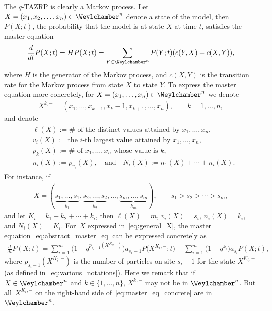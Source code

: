 The $q$-TAZRP is clearly a Markov process. Let $X = (x_1, x_2, \dotsc, x_n) \in \Weylchamber^n$ denote a state of the model, then $P(X; t)$, the probability that the model is at state $X$ at time $t$, satisf\/ies the master equation
\begin{gather} \label{eq:abstract_master_eq}
 \frac{d}{dt} P(X; t) = H P(X; t) = \sum_{Y \in \Weylchamber^n} P(Y; t) (c(Y, X) - c(X, Y)),
\end{gather}
where $H$ is the generator of the Markov process, and $c(X, Y)$ is the transition rate for the Markov process from state $X$ to state $Y$. To express the master equation more concretely, for $X = (x_1, \dotsc, x_n) \in \Weylchamber^n$ we denote
\begin{gather*}
 X^{k, -} = (x_1, \dotsc, x_{k - 1}, x_k - 1, x_{k + 1}, \dotsc, x_n), \qquad k = 1, \dotsc, n,
\end{gather*}
and denote
\begin{gather} \label{eq:various_notations}
 \begin{split}
 & \ell(X) :=  \text{$\#$ of the distinct values attained by $x_1, \dotsc, x_n$}, \\
 & v_i(X) :=  \text{the $i$-th largest value attained by $x_1, \dotsc, x_n$}, \\
& p_k(X) :=  \text{$\#$ of $x_1, \dotsc, x_n$ whose value is $k$}, \\
 & n_i(X) :=  p_{v_i}(X), \quad \text{and} \quad N_i(X) := n_1(X) + \dotsb + n_i(X).
 \end{split}
\end{gather}
For instance, if
\begin{gather} \label{eq:general_X}
 X = (\underbrace{s_1, \dotsc, s_1}_{k_1}, \underbrace{s_2, \dotsc, s_2}_{k_2}, \dotsc, \underbrace{s_m, \dotsc, s_m}_{k_m}), \qquad s_1 > s_2 > \dotsb > s_m,
\end{gather}
and let $K_i = k_1 + k_2 + \dotsb + k_i$, then $\ell(X) = m$, $v_i(X) = s_i$, $n_i(X) = k_i$, and $N_i(X) = K_i$. For~$X$ expressed in~\eqref{eq:general_X}, the master equation~\eqref{eq:abstract_master_eq} can be expressed concretely as
\begin{gather} \label{eq:master_eq_concrete}
 \frac{d}{dt} P(X; t) = \sum^m_{i = 1} \big(1 - q^{p_{s_i - 1}(X^{K_i, -})}\big) a_{s_i - 1} P\big(X^{K_i, -}; t\big) - \sum^m_{i = 1} \big(1 - q^{k_i}\big) a_{s_i} P(X; t),
\end{gather}
where $p_{s_i - 1}(X^{K_i, -})$ is the number of particles on site $s_i - 1$ for the state $X^{K_i, -}$ (as def\/ined in~\eqref{eq:various_notations}). Here we remark that if $X \in \Weylchamber^n$ and $k \in \{ 1, \dotsc, n \}$, $X^{k, -}$ may not be in $\Weylchamber^n$. But all~$X^{K_i, -}$ on the right-hand side of~\eqref{eq:master_eq_concrete} are in~$\Weylchamber^n$.

